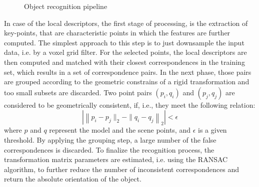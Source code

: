 \begin{figure}[H]
\begin{center}

\caption{Object recognition pipeline \cite{AldomaMTWPZRGV12}}

\label{fig:objpipe}

\end{center}
\end{figure}

In case of the local descriptors, the first stage of processing, is the extraction of key-points, that are characteristic points in which the features are further computed. The simplest approach to this step is to just downsample the input data, i.e. by a voxel grid filter. For the selected points, the local descriptors are then computed and matched with their closest correspondences in the training set, which results in a set of correspondence pairs. In the next phase, those pairs are grouped according to the geometric constrains of a rigid transformation and too small subsets are discarded. Two point pairs $(p_i, q_i)$ and $(p_j, q_j)$ are considered to be geometrically consistent, if, i.e., they meet the following relation:
$$ \left|\left\|p_i - p_j\|_2-\|q_i - q_j\right\|_2\right| < \epsilon $$
where $p$ and $q$ represent the model and the scene points, and $\epsilon$ is a given threshold. By applying the grouping step, a large number of the false correspondences is discarded. To finalize the recognition process, the transformation matrix parameters are estimated, i.e. using the RANSAC algorithm, to further reduce the number of inconsistent correspondences and return the absolute orientation of the object.


